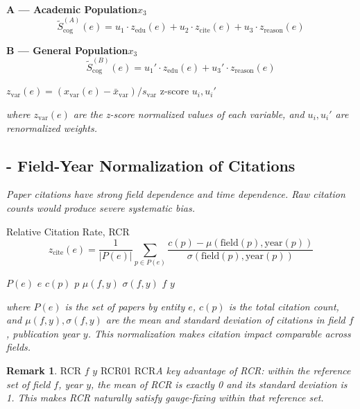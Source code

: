 \documentclass[11pt,a4paper]{article}
\theoremstyle{definition}
\newtheorem{remark}{ Remark}[section]
\begin{document}
\bigskip
\textbf{ A —  Academic Population}$x_3$ 
\begin{equation}
    \tilde{S}_{\text{cog}}^{(A)}(e) = u_1 \cdot z_{\text{edu}}(e) + u_2 \cdot z_{\text{cite}}(e) + u_3 \cdot z_{\text{reason}}(e)
    \label{eq:cog-A}
\end{equation}

\textbf{ B —  General Population}$x_3$ 
\begin{equation}
    \tilde{S}_{\text{cog}}^{(B)}(e) = u_1' \cdot z_{\text{edu}}(e) + u_3' \cdot z_{\text{reason}}(e)
    \label{eq:cog-B}
\end{equation}

 $z_{\text{var}}(e) = (x_{\text{var}}(e) - \bar{x}_{\text{var}}) / s_{\text{var}}$ z-score
$u_i, u_i'$ 

\medskip
\noindent\textit{where $z_{\text{var}}(e)$ are the z-score normalized values of each variable, and $u_i, u_i'$ are renormalized weights.}

\subsection{- Field-Year Normalization of Citations}




\medskip
\noindent\textit{Paper citations have strong field dependence and time dependence. Raw citation counts would produce severe systematic bias.}

\bigskip
\textbf{}Relative Citation Rate, RCR
\begin{equation}
    z_{\text{cite}}(e) = \frac{1}{|P(e)|} \sum_{p \in P(e)} \frac{c(p) - \mu(\text{field}(p), \text{year}(p))}{\sigma(\text{field}(p), \text{year}(p))}
    \label{eq:rcr}
\end{equation}

 $P(e)$  $e$ $c(p)$  $p$ 
$\mu(f, y)$  $\sigma(f, y)$  $f$ $y$ 


\medskip
\noindent\textit{where $P(e)$ is the set of papers by entity $e$, $c(p)$ is the total citation count, and $\mu(f,y), \sigma(f,y)$ are the mean and standard deviation of citations in field $f$, publication year $y$. This normalization makes citation impact comparable across fields.}

\begin{remark}
RCR $f$ $y$ RCR01
RCR\textit{A key advantage of RCR: within the reference set of field $f$, year $y$, the mean of RCR is exactly 0 and its standard deviation is 1. This makes RCR naturally satisfy gauge-fixing within that reference set.}
\end{remark}
\end{document}
